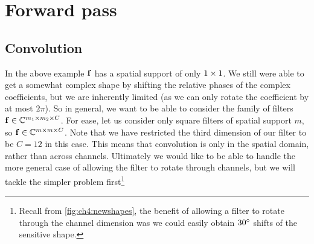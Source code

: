 \section{Forward pass}
\subsection{Convolution}
\newcommand{\SigIn}{z}
\newcommand{\SigOut}{w}
\newcommand{\Filter}{f}
\newcommand{\SigInB}{\bmu{\SigIn}}
\newcommand{\SigOutB}{\bmu{\SigOut}}
\newcommand{\FilterB}{\bmu{\Filter}}
  
In the above example $\FilterB$ has a spatial support of only $1\times 1$. We still
were able to get a somewhat complex shape by shifting the relative phases of
the complex coefficients, but we are inherently limited (as we can only
rotate the coefficient by at most $2\pi$). So in general, we want to be able
to consider the family of filters $\FilterB \in \complexes[m_1 \x m_2 \x C]$. For
ease, let us consider only square filters of spatial support $m$, so
$\FilterB \in \complexes[m\x m\x C]$. Note that we have restricted the third
dimension of our filter to be $C=12$ in this case. This means that convolution is
only in the spatial domain, rather than across channels. Ultimately we would
like to be able to handle the more general case of allowing the filter to
rotate through channels, but we will tackle the simpler problem 
first\footnote{Recall from \autoref{fig:ch4:newshapes}, the benefit of allowing
a filter to rotate through the channel dimension was we could easily obtain
$30^{\circ}$ shifts of the sensitive shape.}

